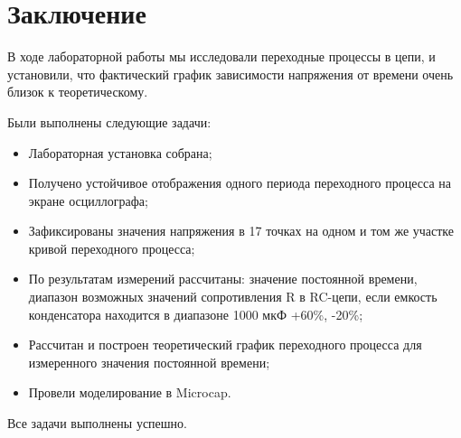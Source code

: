\chapter*{Заключение}
\label{ch:concl}

В ходе лабораторной работы мы исследовали переходные процессы в цепи, и установили, что фактический график зависимости напряжения от времени очень близок к теоретическому.

Были выполнены следующие задачи:
\begin{itemize}
    \item Лабораторная установка собрана;
    \item Получено устойчивое отображения одного периода переходного процесса на экране осциллографа;
    \item Зафиксированы значения напряжения в 17 точках на одном и том же участке кривой переходного процесса;
    \item По результатам измерений рассчитаны: значение постоянной времени, диапазон возможных значений сопротивления R в RC-цепи, если емкость конденсатора находится в диапазоне 1000 мкФ +60\%, -20\%;
    \item Рассчитан и построен теоретический график переходного процесса для измеренного значения постоянной времени;
    \item Провели моделирование в Microcap.

\end{itemize}
Все задачи выполнены успешно.

\endinput